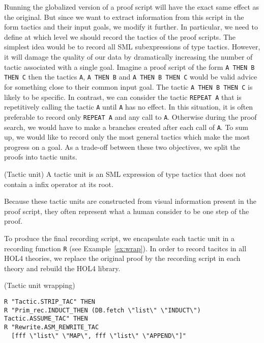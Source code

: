 \documentclass[runningheads,a4paper,draft]{svjour3}
\def\holfour{\textsf{HOL4}\xspace}
\def\sml{\textsf{SML}\xspace}
\begin{document}
Running the globalized version of a proof script will have the exact same 
effect as the original. But since we want to extract information from this 
script in the form tactics and their input goals, we modify it further.
In particular, we need to define at which level we should record the tactics of 
the proof scripts. The simplest idea would be to record all \sml subexpressions 
of type tactics. However, it will damage the quality of our data by 
dramatically increasing the number of tactic associated with a single goal.
Imagine a proof script of the form \texttt{A THEN B THEN C} then the tactics
\texttt{A}, \texttt{A THEN B} and \texttt{A THEN B THEN C} would be valid 
advice for something close to their common input goal. The tactic  
\texttt{A THEN B THEN C} is likely to be specific. In contrast, we can consider 
the tactic \texttt{REPEAT A} that is repetitively calling the tactic \texttt{A} 
until 
\texttt{A} has no effect. In this situation, it is often preferable to record 
only \texttt{REPEAT A} and any call to \texttt{A}. Otherwise during the 
proof search, we would have to make a branches created after each call of 
\texttt{A}. 
To sum up, we would like to record only the most general tactics which 
make the most progress on a goal. As a trade-off between these two objectives,
we split the proofs into tactic units. 

\begin{definition}(Tactic unit)
A tactic unit is an \sml expression of type tactics that does not contain a 
infix operator at its root.
\end{definition}

Because these tactic units are constructed from visual information present in 
the proof script, they often represent what a human consider to be one step of 
the proof.

To produce the final recording script, we encapsulate each tactic unit 
in a recording function \texttt{R} (see Example~\ref{ex:wrap}). In order to 
record 
tacitcs in all \holfour theories, we replace the original proof by the 
recording script in each theory and rebuild the \holfour library.

\begin{example}\label{ex:wrap} (Tactic unit wrapping)
\begin{lstlisting}[language=SMLSmall]
R "Tactic.STRIP_TAC" THEN
R "Prim_rec.INDUCT_THEN (DB.fetch \"list\" \"INDUCT\") Tactic.ASSUME_TAC" THEN
R "Rewrite.ASM_REWRITE_TAC 
  [fff \"list\" \"MAP\", fff \"list\" \"APPEND\"]"
\end{lstlisting}
\end{example}   
\end{document}
